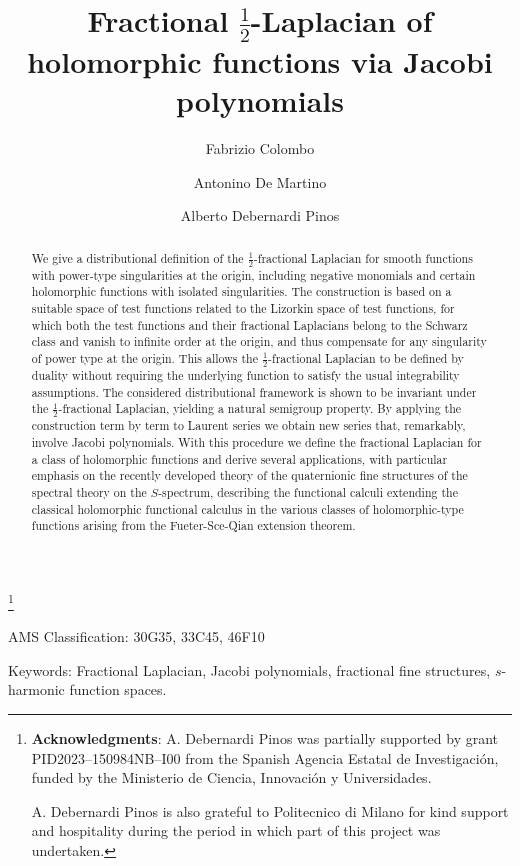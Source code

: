 \documentclass[reqno,11pt]{amsart}
\title[Fractional $\frac{1}{2}$-Laplacian of holomorphic functions via Jacobi polynomials]
{Fractional $\frac{1}{2}$-Laplacian of holomorphic functions via Jacobi polynomials}
\author[Fabrizio Colombo]{Fabrizio Colombo}
\author[Antonino De Martino]{Antonino De Martino}
\author[Alberto Debernardi Pinos]{Alberto Debernardi Pinos}
\theoremstyle{definition}
\newcommand\blfootnote[1]{
	\begingroup
	\renewcommand\thefootnote{}\footnote{#1}
	\addtocounter{footnote}{-1}
	\endgroup
}
\begin{document}
\maketitle



\begin{abstract}
We give a distributional definition of the $\frac{1}{2}$-fractional Laplacian for smooth functions with power-type singularities at the origin, including negative monomials and certain holomorphic functions with isolated singularities. The construction is based on a suitable space of test functions related to the Lizorkin space of test functions, for which both the test functions and their fractional Laplacians belong to the Schwarz class and vanish to infinite order at the origin, and thus compensate for any singularity of power type at the origin. This allows the $\frac{1}{2}$-fractional Laplacian to be defined by duality without requiring the underlying function to satisfy the usual integrability assumptions. The considered distributional framework is shown to be invariant under the $\frac{1}{2}$-fractional Laplacian, yielding a natural semigroup property.
By applying the construction term by term to Laurent series we obtain new series that, remarkably, involve Jacobi polynomials. With this procedure we define the fractional Laplacian for a class of holomorphic functions and derive several applications, with particular emphasis on the recently developed theory of the quaternionic fine structures  of the spectral theory on the $S$-spectrum, describing the functional calculi extending the classical holomorphic functional calculus in the various classes of holomorphic-type functions arising from the Fueter-Sce-Qian extension theorem.
\end{abstract}


\blfootnote{\textbf{Acknowledgments}: A. Debernardi Pinos was partially supported by
grant PID2023--150984NB--I00 from the Spanish Agencia Estatal de Investigaci\'on, funded by the Ministerio de Ciencia, Innovaci\'on y Universidades.

A. Debernardi Pinos is also grateful to Politecnico di Milano for kind support and  hospitality during the period in which part of this project was undertaken.
}



\medskip
\noindent AMS Classification: 30G35, 33C45, 46F10

\noindent Keywords: Fractional Laplacian, Jacobi polynomials, fractional fine structures, $s$-harmonic function spaces.
\end{document}
